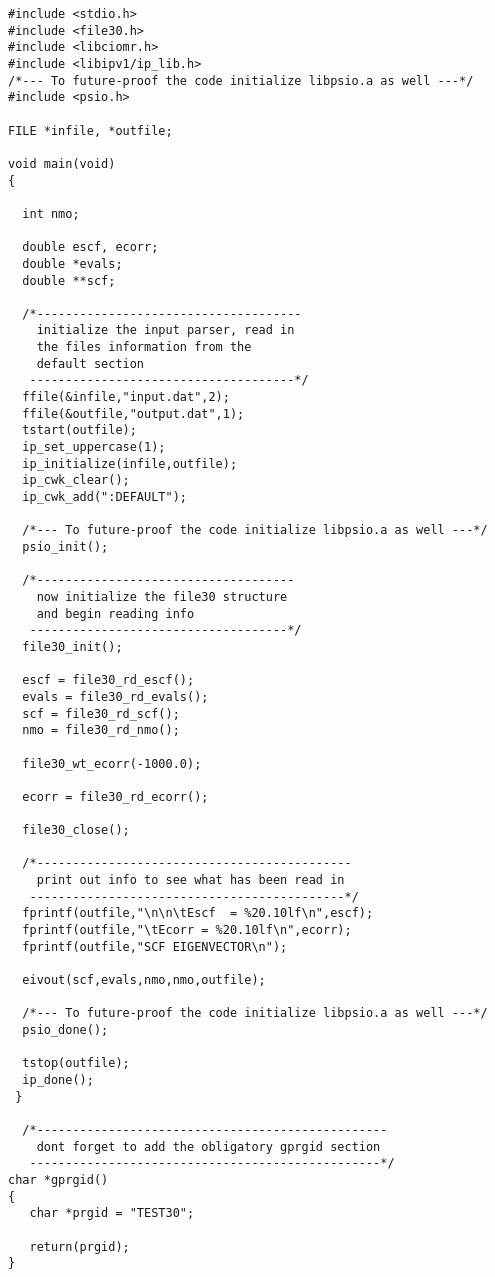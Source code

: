 \begin{verbatim}
#include <stdio.h>
#include <file30.h>
#include <libciomr.h>
#include <libipv1/ip_lib.h>
/*--- To future-proof the code initialize libpsio.a as well ---*/
#include <psio.h>

FILE *infile, *outfile;

void main(void)
{
 
  int nmo;

  double escf, ecorr;
  double *evals;
  double **scf;

  /*-------------------------------------
    initialize the input parser, read in
    the files information from the
    default section
   -------------------------------------*/
  ffile(&infile,"input.dat",2);
  ffile(&outfile,"output.dat",1);
  tstart(outfile);
  ip_set_uppercase(1);
  ip_initialize(infile,outfile);
  ip_cwk_clear();
  ip_cwk_add(":DEFAULT");

  /*--- To future-proof the code initialize libpsio.a as well ---*/
  psio_init();

  /*------------------------------------
    now initialize the file30 structure
    and begin reading info
   ------------------------------------*/
  file30_init();

  escf = file30_rd_escf();
  evals = file30_rd_evals();
  scf = file30_rd_scf();
  nmo = file30_rd_nmo();
 
  file30_wt_ecorr(-1000.0);
  
  ecorr = file30_rd_ecorr();

  file30_close();

  /*--------------------------------------------
    print out info to see what has been read in
   --------------------------------------------*/
  fprintf(outfile,"\n\n\tEscf  = %20.10lf\n",escf);
  fprintf(outfile,"\tEcorr = %20.10lf\n",ecorr);
  fprintf(outfile,"SCF EIGENVECTOR\n");

  eivout(scf,evals,nmo,nmo,outfile); 
  
  /*--- To future-proof the code initialize libpsio.a as well ---*/
  psio_done();
  
  tstop(outfile);
  ip_done();
 }

  /*-------------------------------------------------
    dont forget to add the obligatory gprgid section 
   -------------------------------------------------*/
char *gprgid()
{
   char *prgid = "TEST30";

   return(prgid);
}
\end{verbatim}

